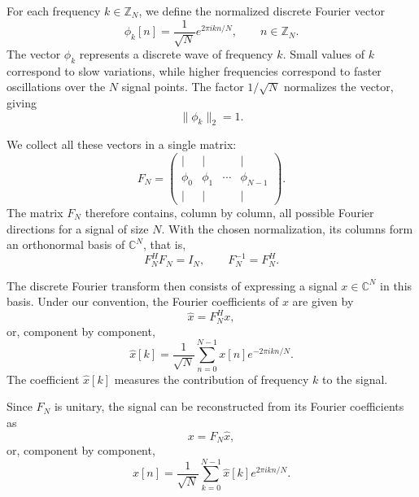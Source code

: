 For each frequency $k\in\mathbb{Z}_N$, we define the normalized discrete Fourier vector
\begin{equation}
    \phi_k[n]
    =
    \frac{1}{\sqrt{N}}
    e^{2\pi i kn/N},
    \qquad n\in\mathbb{Z}_N.
    \label{eq:def_base_fourier_1d}
\end{equation}
The vector $\phi_k$ represents a discrete wave of frequency $k$. Small values of $k$
correspond to slow variations, while higher frequencies correspond to
faster oscillations over the $N$ signal points. The factor $1/\sqrt{N}$ normalizes the
vector, giving
\[
    \|\phi_k\|_2 = 1.
\]

We collect all these vectors in a single matrix:
\begin{equation}
    F_N
    =
    \begin{pmatrix}
    | & | &        & | \\
    \phi_0 & \phi_1 & \cdots & \phi_{N-1} \\
    | & | &        & |
    \end{pmatrix}.
    \label{eq:def_matrice_fourier_1d}
\end{equation}
The matrix $F_N$ therefore contains, column by column, all possible Fourier directions
for a signal of size $N$. With the chosen normalization, its columns form an
orthonormal basis of $\mathbb{C}^N$, that is,
\[
    F_N^H F_N = I_N,
    \qquad
    F_N^{-1}=F_N^H.
\]

The discrete Fourier transform then consists of expressing a signal
$x\in\mathbb{C}^N$ in this basis. Under our convention, the Fourier coefficients of $x$ are
given by
\begin{equation}
    \widehat{x}
    =
    F_N^H x,
\end{equation}
or, component by component,
\begin{equation}
    \widehat{x}[k]
    =
    \frac{1}{\sqrt{N}}
    \sum_{n=0}^{N-1}
    x[n]e^{-2\pi i kn/N}.
    \label{eq:def_dft_1d}
\end{equation}
The coefficient $\widehat{x}[k]$ measures the contribution of frequency $k$ to the signal.

Since $F_N$ is unitary, the signal can be reconstructed from its Fourier coefficients as
\begin{equation}
    x
    =
    F_N\widehat{x},
\end{equation}
or, component by component,
\begin{equation}
    x[n]
    =
    \frac{1}{\sqrt{N}}
    \sum_{k=0}^{N-1}
    \widehat{x}[k]e^{2\pi i kn/N}.
    \label{eq:def_idft_1d}
\end{equation}

